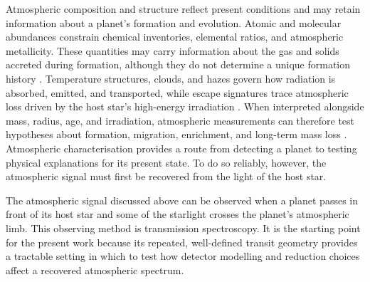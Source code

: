 Atmospheric composition and structure reflect present conditions and may
retain information about a planet's formation and evolution. Atomic and
molecular abundances constrain chemical inventories, elemental ratios, and
atmospheric metallicity. These quantities may carry information about the gas
and solids accreted during formation, although they do not determine a unique
formation history \citep{ObergEtAl2011}. Temperature structures, clouds, and
hazes govern how radiation is absorbed, emitted, and transported, while escape
signatures trace atmospheric loss driven by the host star's high-energy
irradiation
\citep{VidalMadjarEtAl2003}. When interpreted alongside mass, radius, age, and
irradiation, atmospheric measurements can therefore test hypotheses about
formation, migration, enrichment, and long-term mass loss
\citep{Madhusudhan2019}. Atmospheric characterisation provides a route from
detecting a planet to testing physical explanations for its present state. To
do so reliably, however, the atmospheric signal must first be recovered from
the light of the host star.

The atmospheric signal discussed above can be observed when a planet passes in
front of its host star and some of the starlight crosses the planet's
atmospheric limb. This observing method is transmission spectroscopy. It is the
starting point for the present work because its repeated, well-defined transit
geometry provides a tractable setting in which to test how detector modelling
and reduction choices affect a recovered atmospheric spectrum.


